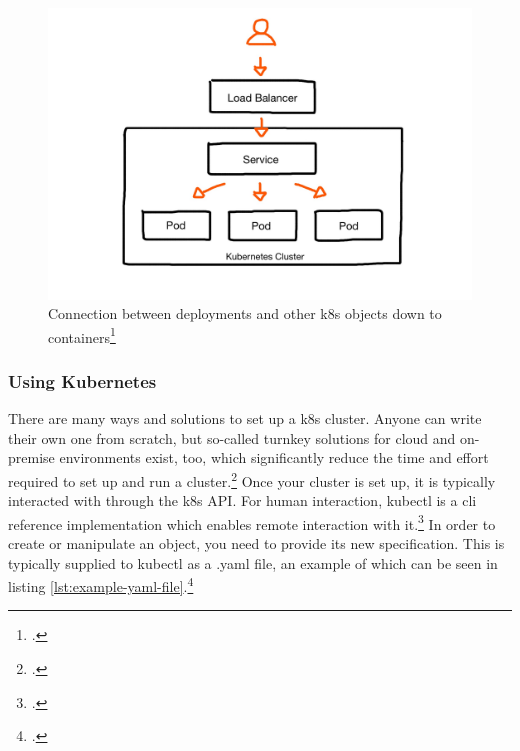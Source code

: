 \begin{figure}
\includegraphics[scale=0.2]{pictures/loadbalancer.JPG} 
\caption{Connection between deployments and other \gls{k8s} objects down to containers\protect\footcite{nicoPictures}}
\label{fig:loadbalancer}
\end{figure}


\subsubsection{Using Kubernetes}
There are many ways and solutions to set up a \gls{k8s} cluster. Anyone can write their own one from scratch, but so-called turnkey solutions for cloud and on-premise environments exist, too, which significantly reduce the time and effort required to set up and run a cluster.\footcite[][, sections 'Turnkey Cloud Solutions' and 'On-Premises turnkey cloud solutions']{turnkey}
Once your cluster is set up, it is typically interacted with through the \gls{k8s} API. For human interaction, kubectl is a \gls{cli} reference implementation which enables remote interaction with it.\footcite[][, section 'The Kubernetes API']{k8sApi}
In order to create or manipulate an object, you need to provide its new specification. This is typically supplied to kubectl as a .yaml file, an example of which can be seen in listing \ref{lst:example-yaml-file}.\footcite[][, section 'Describing a Kubernetes Object']{k8sObjects}

